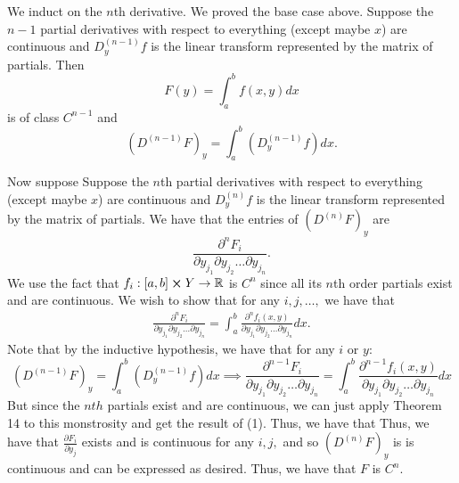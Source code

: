\documentclass[11pt]{article}
\newcommand{\bbR}{\mathbb{R}}
\begin{document}
\begin{enumerate}
\begin{solution}
    We induct on the $n$th derivative. We proved the base case above. Suppose the $n-1$ partial derivatives with respect to everything (except maybe $x$) are continuous and $D^{(n-1)}_yf$ is the linear transform represented by the  matrix of partials. Then 
    \[F(y) = \int_a^b f(x,y)dx\] is of class $C^{n-1}$ and 
    \[(D^{(n-1)}F)_y = \int_a^b (D^{(n-1)}_yf)dx.\]

    Now suppose Suppose the $n$th partial derivatives with respect to everything (except maybe $x$) are continuous and $D^{(n)}_yf$ is the linear transform represented by the matrix of partials. We have that the entries of $(D^{(n)}F)_y$ are
    \[\frac{\partial^n F_i}{\partial y_{j_1}\partial y_{j_2}\dots \partial y_{j_n}}.\] We use the fact that $f_i: [a,b]\cross Y \to \bbR$ is $C^n$ since all its $n$th order partials exist and are continuous. We wish to show that for any $i,j, \dots,$ we have that 
    \begin{align}
        \frac{\partial^n F_i}{\partial y_{j_1}\partial y_{j_2}\dots \partial y_{j_n}} = \int_a^b \frac{\partial^n f_i(x,y)}{\partial y_{j_1}\partial y_{j_2}\dots \partial y_{j_n}}dx.
    \end{align} Note that by the inductive hypothesis, we have that for any $i$ or $y:$ 
    \[(D^{(n-1)}F)_y  = \int_a^b (D^{(n-1)}_yf)dx \implies \frac{\partial^{n-1} F_i}{\partial y_{j_1}\partial y_{j_2}\dots \partial y_{j_n}} = \int_a^b \frac{\partial^{n-1} f_i(x,y)}{\partial y_{j_1}\partial y_{j_2}\dots \partial y_{j_n}}dx\] But since the $nth$ partials exist and are continuous, we can just apply Theorem 14 to this monstrosity and get the result of (1). Thus, we have that  Thus, we have that $\frac{\partial F_i}{\partial y_j}$ exists and is continuous for any $i,j,$ and so $(D^{(n)}F)_y$ is is continuous and can be expressed as desired. Thus, we have that $F$ is $C^n.$
    \end{solution}
\end{enumerate}

\newpage
\end{document}
